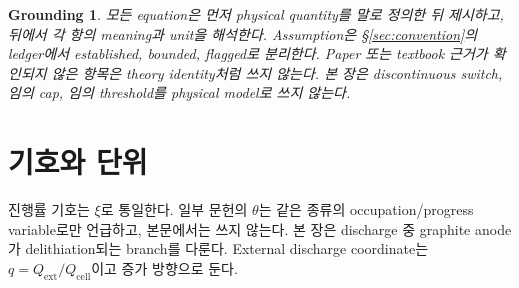 \documentclass[11pt,a4paper]{article}
\newtheorem*{groundingbox}{Grounding}
\newcommand{\cell}{\mathrm{cell}}
\newcommand{\ext}{\mathrm{ext}}
\begin{document}
\begin{groundingbox}
모든 equation은 먼저 physical quantity를 말로 정의한 뒤 제시하고, 뒤에서 각 항의 meaning과 unit을 해석한다.
Assumption은 \S\ref{sec:convention}의 ledger에서 established, bounded, flagged로 분리한다. Paper 또는 textbook 근거가
확인되지 않은 항목은 theory identity처럼 쓰지 않는다. 본 장은 discontinuous switch, 임의 cap, 임의 threshold를 physical model로 쓰지 않는다.
\end{groundingbox}

\tableofcontents
\newpage

\section{기호와 단위}\label{sec:notation}
진행률 기호는 $\xi$로 통일한다. 일부 문헌의 $\theta$는 같은 종류의 occupation/progress variable로만 언급하고,
본문에서는 쓰지 않는다. 본 장은 discharge 중 graphite anode가 delithiation되는 branch를 다룬다. External discharge
coordinate는 $q=Q_{\ext}/Q_{\cell}$이고 증가 방향으로 둔다.
\end{document}
